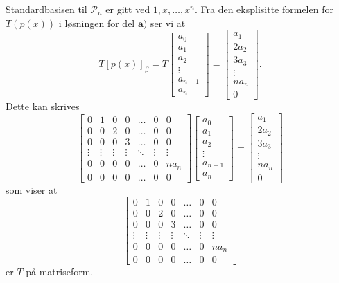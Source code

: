 \begin{losning}
\begin{punkt}
\noindent
Standardbasisen til $\mathcal{P}_n$ er gitt ved $1,x,\dots,x^n$. Fra den eksplisitte formelen for $T(p(x))$ i løsningen for del $\textbf{a)}$ ser vi at $$T[p(x)]_\beta=T\begin{bmatrix}
a_0\\
a_1\\
a_2\\
\vdots\\
a_{n-1}\\
a_n
\end{bmatrix}=\begin{bmatrix}
a_1\\
2a_2\\
3a_3\\
\vdots\\
na_n\\
0
\end{bmatrix}.$$ Dette kan skrives 
$$\begin{bmatrix}
0 & 1 & 0 & 0 & \dots & 0 & 0\\
0 & 0 & 2 & 0 & \dots & 0 & 0\\
0 & 0 & 0 & 3 & \dots & 0 & 0\\
\vdots & \vdots & \vdots & \vdots & \ddots & \vdots & \vdots\\
0 & 0 & 0 & 0 & \dots & 0 & na_n\\
0 & 0 & 0 & 0 & \dots & 0 & 0
\end{bmatrix}\begin{bmatrix}
a_0\\
a_1\\
a_2\\
\vdots\\
a_{n-1}\\
a_n
\end{bmatrix}=\begin{bmatrix}
a_1\\
2a_2\\
3a_3\\
\vdots\\
na_n\\
0
\end{bmatrix}$$ som viser at $$\begin{bmatrix}
0 & 1 & 0 & 0 & \dots & 0 & 0\\
0 & 0 & 2 & 0 & \dots & 0 & 0\\
0 & 0 & 0 & 3 & \dots & 0 & 0\\
\vdots & \vdots & \vdots & \vdots & \ddots & \vdots & \vdots\\
0 & 0 & 0 & 0 & \dots & 0 & na_n\\
0 & 0 & 0 & 0 & \dots & 0 & 0
\end{bmatrix}$$ er $T$ på matriseform.
\end{punkt}


\end{losning}


